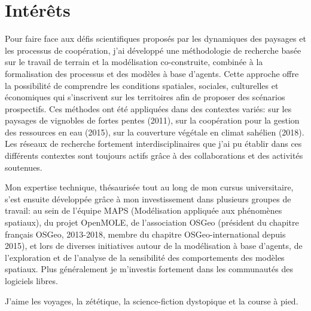 \documentclass[]{cv-etienne}
\begin{document}
\section{Intérêts}
Pour faire face aux défis scientifiques proposés par les dynamiques des paysages et les processus de coopération, j'ai développé une méthodologie de recherche basée sur le travail de terrain et la modélisation co-construite, combinée à la formalisation des processus et des modèles à base d'agents.
Cette approche offre la possibilité de comprendre les conditions spatiales, sociales, culturelles et économiques qui s'inscrivent sur les territoires afin de proposer des scénarios prospectifs.
Ces méthodes ont été appliquées dans des contextes variés: sur les paysages de vignobles de fortes pentes (2011), sur la coopération pour la gestion des ressources en eau (2015), sur la couverture végétale en climat sahélien (2018).
Les réseaux de recherche fortement interdisciplinaires que j'ai pu établir dans ces différents contextes sont toujours actifs grâce à des collaborations et des activités soutenues.

Mon expertise technique, thésaurisée tout au long de mon cursus universitaire, s'est ensuite développée grâce à mon investissement dans plusieurs groupes de travail: au sein de l'équipe MAPS (Modélisation appliquée aux phénomènes spatiaux), du projet OpenMOLE, de l'association OSGeo (président du chapitre français OSGeo, 2013-2018, membre du chapitre OSGeo-international depuis 2015), et lors de diverses initiatives autour de la modélisation à base d'agents, de l'exploration et de l'analyse de la sensibilité des comportements des modèles spatiaux. Plus généralement je m'investis fortement dans les communautés des logiciels libres.

J'aime les voyages, la zététique, la science-fiction dystopique et la course à pied.
\end{document}
